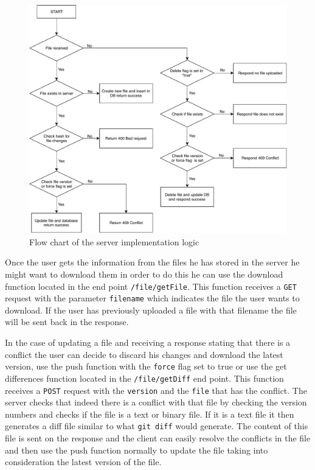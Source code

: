 \documentclass[11pt]{article}
\begin{document}
\begin{figure}[H]
	\centering
	\includegraphics[scale=0.6]{graphics/server-implementation-logic.pdf}
	\caption{Flow chart of the server implementation logic}
	\label{fig:server-implementation-logic}
\end{figure}

Once the user gets the information from the files he has stored in the server he might want to download them in order to do this he can use the download function located in the end point {\tt /file/getFile}. This function receives a {\tt GET} request with the parameter {\tt filename} which indicates the file the user wants to download. If the user has previously uploaded a file with that filename the file will be sent back in the response.

In the case of updating a file and receiving a response stating that there is a conflict the user can decide to discard his changes and download the latest version, use the push function with the {\tt force} flag set to true or use the get differences function located in the {\tt /file/getDiff} end point. This function receives a {\tt POST} request with the {\tt version} and the {\tt file} that has the conflict. The server checks that indeed there is a conflict with that file by checking the version numbers and checks if the file is a text or binary file. If it is a text file it then generates a diff file similar to what {\tt git diff} would generate. The content of this file is sent on the response and the client can easily resolve the conflicts in the file and then use the push function normally to update the file taking into consideration the latest version of the file.
\end{document}
